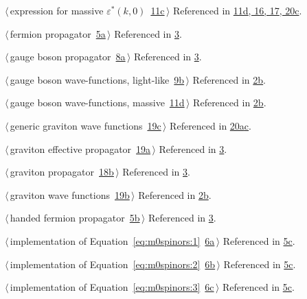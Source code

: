 \documentclass[a4paper,12pt]{amsart}
\renewcommand{\NWlink}[2]{\hyperlink{#1}{#2}}
\renewcommand{\NWtxtRefIn}{Referenced in}
\begin{document}
{\begin{list}{}{\setlength{\itemsep}{-\parsep}\setlength{\itemindent}{-\leftmargin}}
{}
\item $\langle\,$expression for massive $\varepsilon^\ast(k, 0)$\nobreak\ {\footnotesize \NWlink{nuweb11c}{11c}}$\,\rangle$ {\footnotesize {\NWtxtRefIn} \NWlink{nuweb11d}{11d}\NWlink{nuweb16}{, 16}\NWlink{nuweb17}{, 17}\NWlink{nuweb20c}{, 20c}.
}
\item $\langle\,$fermion propagator\nobreak\ {\footnotesize \NWlink{nuweb5a}{5a}}$\,\rangle$ {\footnotesize {\NWtxtRefIn} \NWlink{nuweb3}{3}.}
\item $\langle\,$gauge boson propagator\nobreak\ {\footnotesize \NWlink{nuweb8a}{8a}}$\,\rangle$ {\footnotesize {\NWtxtRefIn} \NWlink{nuweb3}{3}.}
\item $\langle\,$gauge boson wave-functions, light-like\nobreak\ {\footnotesize \NWlink{nuweb9b}{9b}}$\,\rangle$ {\footnotesize {\NWtxtRefIn} \NWlink{nuweb2b}{2b}.}
\item $\langle\,$gauge boson wave-functions, massive\nobreak\ {\footnotesize \NWlink{nuweb11d}{11d}}$\,\rangle$ {\footnotesize {\NWtxtRefIn} \NWlink{nuweb2b}{2b}.}
\item $\langle\,$generic graviton wave functions\nobreak\ {\footnotesize \NWlink{nuweb19c}{19c}}$\,\rangle$ {\footnotesize {\NWtxtRefIn} \NWlink{nuweb20a}{20a}\NWlink{nuweb20c}{c}.
}
\item $\langle\,$graviton effective propagator\nobreak\ {\footnotesize \NWlink{nuweb19a}{19a}}$\,\rangle$ {\footnotesize {\NWtxtRefIn} \NWlink{nuweb3}{3}.}
\item $\langle\,$graviton propagator\nobreak\ {\footnotesize \NWlink{nuweb18b}{18b}}$\,\rangle$ {\footnotesize {\NWtxtRefIn} \NWlink{nuweb3}{3}.}
\item $\langle\,$graviton wave functions\nobreak\ {\footnotesize \NWlink{nuweb19b}{19b}}$\,\rangle$ {\footnotesize {\NWtxtRefIn} \NWlink{nuweb2b}{2b}.}
\item $\langle\,$handed fermion propagator\nobreak\ {\footnotesize \NWlink{nuweb5b}{5b}}$\,\rangle$ {\footnotesize {\NWtxtRefIn} \NWlink{nuweb3}{3}.}
\item $\langle\,$implementation of Equation~\eqref{eq:m0spinors:1}\nobreak\ {\footnotesize \NWlink{nuweb6a}{6a}}$\,\rangle$ {\footnotesize {\NWtxtRefIn} \NWlink{nuweb5c}{5c}.}
\item $\langle\,$implementation of Equation~\eqref{eq:m0spinors:2}\nobreak\ {\footnotesize \NWlink{nuweb6b}{6b}}$\,\rangle$ {\footnotesize {\NWtxtRefIn} \NWlink{nuweb5c}{5c}.}
\item $\langle\,$implementation of Equation~\eqref{eq:m0spinors:3}\nobreak\ {\footnotesize \NWlink{nuweb6c}{6c}}$\,\rangle$ {\footnotesize {\NWtxtRefIn} \NWlink{nuweb5c}{5c}.}

\end{list}}
\end{document}
